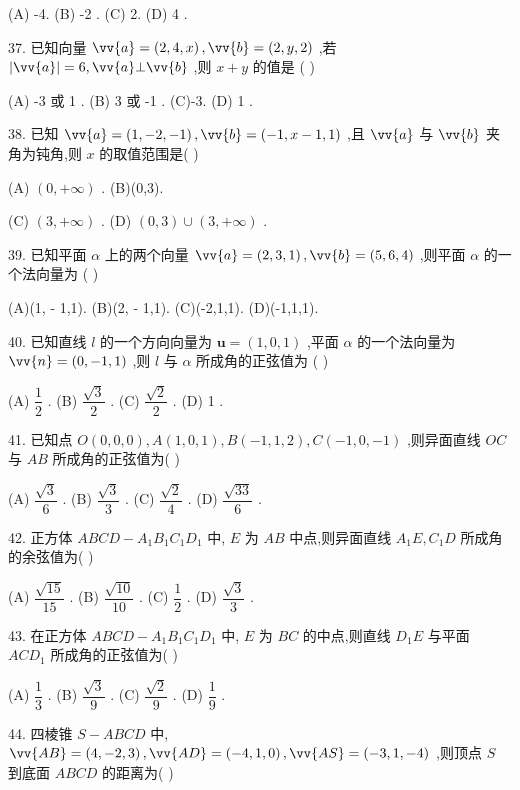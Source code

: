 (A) -4. (B) -2 . (C) 2. (D) 4 .

37. 已知向量 $\vv{a} = \left( {2,4,x}\right) ,\vv{b} = \left( {2,y,2}\right)$ ,若 $\left| \vv{a}\right|  = 6,\vv{a}\bot \vv{b}$ ,则 $x + y$ 的值是 (   )

(A) -3 或 1 . (B) 3 或 -1 . (C)-3. (D) 1 .

38. 已知 $\vv{a} = \left( {1, - 2, - 1}\right) ,\vv{b} = \left( {-1,x - 1,1}\right)$ ,且 $\vv{a}$ 与 $\vv{b}$ 夹角为钝角,则 $x$ 的取值范围是(   )

(A) $\left( {0, + \infty }\right)$ . (B)(0,3).

(C) $\left( {3, + \infty }\right)$ . (D) $\left( {0,3}\right)  \cup  \left( {3, + \infty }\right)$ .

39. 已知平面 $\alpha$ 上的两个向量 $\vv{a} = \left( {2,3,1}\right) ,\vv{b} = \left( {5,6,4}\right)$ ,则平面 $\alpha$ 的一个法向量为 (   )

(A)(1, - 1,1). (B)(2, - 1,1). (C)(-2,1,1). (D)(-1,1,1).

40. 已知直线 $l$ 的一个方向向量为 $\mathbf{u} = \left( {1,0,1}\right)$ ,平面 $\alpha$ 的一个法向量为 $\vv{n} = \left( {0, - 1,1}\right)$ ,则 $l$ 与 $\alpha$ 所成角的正弦值为 (   )

(A) $\dfrac{1}{2}$ . (B) $\dfrac{\sqrt{3}}{2}$ . (C) $\dfrac{\sqrt{2}}{2}$ . (D) 1 .

41. 已知点 $O\left( {0,0,0}\right) ,A\left( {1,0,1}\right) ,B\left( {-1,1,2}\right) ,C\left( {-1,0, - 1}\right)$ ,则异面直线 ${OC}$ 与 ${AB}$ 所成角的正弦值为(   )

(A) $\dfrac{\sqrt{3}}{6}$ . (B) $\dfrac{\sqrt{3}}{3}$ . (C) $\dfrac{\sqrt{2}}{4}$ . (D) $\dfrac{\sqrt{33}}{6}$ .

42. 正方体 ${ABCD} - {A}_{1}{B}_{1}{C}_{1}{D}_{1}$ 中, $E$ 为 ${AB}$ 中点,则异面直线 ${A}_{1}E,{C}_{1}D$ 所成角的余弦值为(   )

(A) $\dfrac{\sqrt{15}}{15}$ . (B) $\dfrac{\sqrt{10}}{10}$ . (C) $\dfrac{1}{2}$ . (D) $\dfrac{\sqrt{3}}{3}$ .

43. 在正方体 ${ABCD} - {A}_{1}{B}_{1}{C}_{1}{D}_{1}$ 中, $E$ 为 ${BC}$ 的中点,则直线 ${D}_{1}E$ 与平面 ${AC}{D}_{1}$ 所成角的正弦值为(   )

(A) $\dfrac{1}{3}$ . (B) $\dfrac{\sqrt{3}}{9}$ . (C) $\dfrac{\sqrt{2}}{9}$ . (D) $\dfrac{1}{9}$ .

44. 四棱锥 $S - {ABCD}$ 中, $\vv{AB} = \left( {4, - 2,3}\right) ,\vv{AD} = \left( {-4,1,0}\right) ,\vv{AS} = \left( {-3,1, - 4}\right)$ ,则顶点 $S$ 到底面 ${ABCD}$ 的距离为(   )

